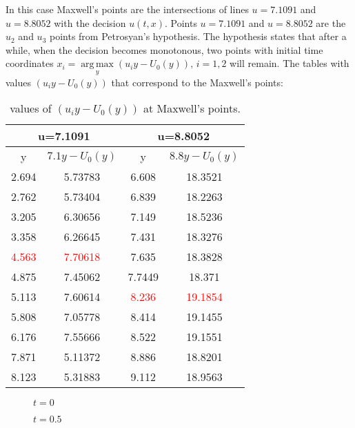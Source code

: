 \documentclass[journal]{IEEEtran}
\DeclareMathOperator*{\argmax}{arg\,max}
\begin{document}
In this case Maxwell's points are the intersections of lines $ u = 7.1091 $ and $ u = 8.8052 $ with the decision $ u (t, x) $. Points $ u = 7.1091 $ and $ u = 8.8052 $ are the  $ u_2 $ and $ u_3 $ points from Petrosyan's hypothesis. The hypothesis states that after a while, when the decision becomes monotonous, two points with initial time coordinates $ x_i = \argmax \limits_ {y} (u_iy-U_0 (y)), \, i = 1,2$ will remain. The tables with values $ (u_iy-U_0 (y)) $ that correspond to the Maxwell's points:
\begin{table}[h]
	\begin{center}
		\begin{tabular}{|c|c|c|c|}
			\hline
			\multicolumn{2}{|c|}{u=7.1091} & \multicolumn{2}{|c|}{u=8.8052} \\
			\hline
			y&$7.1y-U_0(y)$&y&$8.8y-U_0(y)$\\
			\hline
			2.694 & 5.73783 &6.608&18.3521 \\
			\hline
			2.762 & 5.73404 &6.839&18.2263 \\
			\hline
			3.205 & 6.30656 &7.149&18.5236 \\
			\hline
			3.358 & 6.26645 &7.431&18.3276 \\
			\hline
			\textcolor{red}{4.563} & \textcolor{red}{7.70618} &7.635&18.3828 \\
			\hline
			4.875 & 7.45062 &7.7449&18.371 \\
			\hline
			5.113 & 7.60614 &\textcolor{red}{8.236}&\textcolor{red}{19.1854} \\
			\hline
			5.808 & 7.05778 &8.414&19.1455 \\
			\hline
			6.176 & 7.55666 &8.522&19.1551\\
			\hline
			7.871 & 5.11372 &8.886&18.8201 \\
			\hline
			8.123 & 5.31883 &9.112&18.9563 \\
			\hline
		\end{tabular}
	\end{center}
	\caption{values of $(u_iy-U_0(y))$ at Maxwell's points.}
\end{table} 
\begin{figure}[h!]
	\caption{$t = 0$}
\end{figure}



\begin{figure}[h!]
	\caption{$t = 0.5$}
\end{figure}
\end{document}
